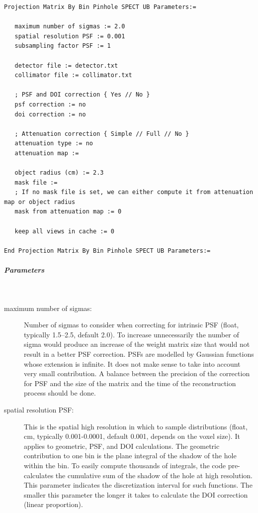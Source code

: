 \documentclass{article}
\newcommand{\subsubsubsubsection}[1]{\subparagraph{#1} \mbox{} \\}
\begin{document}
{{\begin{verbatim}
Projection Matrix By Bin Pinhole SPECT UB Parameters:=

   maximum number of sigmas := 2.0
   spatial resolution PSF := 0.001
   subsampling factor PSF := 1
   
   detector file := detector.txt
   collimator file := collimator.txt

   ; PSF and DOI correction { Yes // No }
   psf correction := no
   doi correction := no
   
   ; Attenuation correction { Simple // Full // No }
   attenuation type := no
   attenuation map :=
   
   object radius (cm) := 2.3
   mask file := 
   ; If no mask file is set, we can either compute it from attenuation map or object radius
   mask from attenuation map := 0
   
   keep all views in cache := 0

End Projection Matrix By Bin Pinhole SPECT UB Parameters:=
\end{verbatim}

{ \subsubsubsubsection{Parameters} }
\begin{description}


\item[maximum number of sigmas:] Number of sigmas to consider when correcting for intrinsic PSF (float, typically 1.5–2.5, default 2.0). To increase unnecessarily the number of sigma would produce an increase of the weight matrix size that would not result in a better PSF correction. PSFs are modelled by Gaussian functions whose extension is infinite. It does not make sense to take into account very small contribution. A balance between the precision of the correction for PSF and the size of the matrix and the time of the reconstruction process should be done.

\item[spatial resolution PSF:] This is the spatial high resolution in which to sample distributions (float, cm, typically 0.001-0.0001, default 0.001, depends on the voxel size). It applies to geometric, PSF, and DOI calculations. The geometric contribution to one bin is the plane integral of the shadow of the hole within the bin. To easily compute thousands of integrals, the code pre-calculates the cumulative sum of the shadow of the hole at high resolution. This parameter indicates the discretization interval for such functions. The smaller this parameter the longer it takes to calculate the DOI correction (linear proportion).


\end{description}}}
\end{document}

